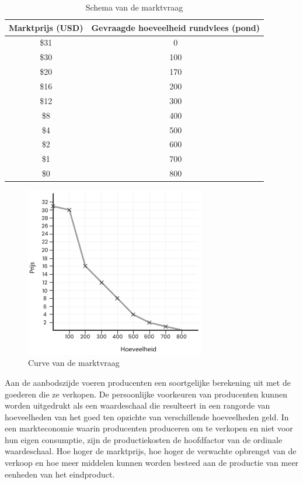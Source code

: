 \begin{table}[H]
\centering
\begin{tabular}{|c|c|}  %
\hline  %
    \cellcolor{gray!25}Marktprijs (USD) &
    \cellcolor{gray!25}Gevraagde hoeveelheid rundvlees (pond) \\
\hline  %
 \$31 & 0 \\ \hline
 \$30 & 100 \\ \hline
 \$20 & 170 \\ \hline
 \$16 & 200 \\ \hline
 \$12 & 300 \\ \hline
 \$8 & 400 \\ \hline
 \$4 & 500 \\ \hline
 \$2 & 600 \\ \hline
 \$1 & 700 \\ \hline
 \$0 & 800 \\ \hline  %
\end{tabular}
\caption{Schema van de marktvraag}
\label{tab4}
\end{table}

\begin{figure}[H]
\centering
    \includegraphics[width=0.7\textwidth]{figures/fig22-1.png}
    \caption[Curve van de marktvraag]{Curve van de marktvraag}
    \label{fig22}
\end{figure}

Aan de aanbodszijde voeren producenten een soortgelijke berekening uit met de goederen die ze verkopen. De persoonlijke voorkeuren van producenten kunnen worden uitgedrukt als een waardeschaal die resulteert in een rangorde van hoeveelheden van het goed ten opzichte van verschillende hoeveelheden geld. In een markteconomie waarin producenten produceren om te verkopen en niet voor hun eigen consumptie, zijn de productiekosten de hoofdfactor van de ordinale waardeschaal. Hoe hoger de marktprijs, hoe hoger de verwachte opbrengst van de verkoop en hoe meer middelen kunnen worden besteed aan de productie van meer eenheden van het eindproduct.

